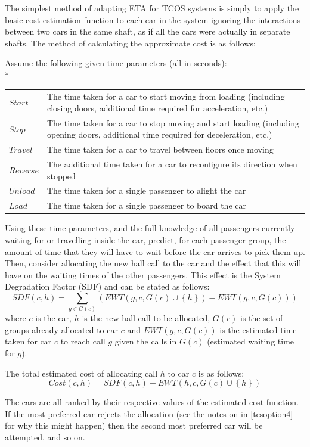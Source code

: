 \documentclass{UoYCSproject}
\begin{document}
The simplest method of adapting ETA for TCOS systems is simply to apply the basic cost estimation function to each car in the system ignoring the interactions between two cars in the same shaft, as if all the cars were actually in separate shafts.  The method of calculating the approximate cost is as follows:

Assume the following given time parameters (all in seconds):\\*
\begin{tabularx}{\linewidth}{l X}
	$Start$		& The time taken for a car to start moving from loading (including closing doors, additional time required for acceleration, etc.) \\
	$Stop$		& The time taken for a car to stop moving and start loading (including opening doors, additional time required for deceleration, etc.) \\
	$Travel$	& The time taken for a car to travel between floors once moving \\
	$Reverse$	& The additional time taken for a car to reconfigure its direction when stopped \\
	$Unload$	& The time taken for a single passenger to alight the car \\
	$Load$		& The time taken for a single passenger to board the car
\end{tabularx}

Using these time parameters, and the full knowledge of all passengers currently waiting for or travelling inside the car, predict, for each passenger group, the amount of time that they will have to wait before the car arrives to pick them up.  Then, consider allocating the new hall call to the car and the effect that this will have on the waiting times of the other passengers.  This effect is the System Degradation Factor (SDF) and can be stated as follows:
\[ SDF(c, h) = \sum\limits_{g \in G(c)} (EWT(g, c, G(c) \cup \left\{ h \right\}) - EWT(g, c, G(c)))\]
where $c$ is the car, $h$ is the new hall call to be allocated, $G(c)$ is the set of groups already allocated to car $c$ and $EWT(g,c,G(c))$ is the estimated time taken for car $c$ to reach call $g$ given the calls in $G(c)$ (estimated waiting time for $g$).

The total estimated cost of allocating call $h$ to car $c$ is as follows:
\[ Cost(c, h) = SDF(c, h) + EWT(h, c, G(c) \cup \left\{ h \right\}) \]

The cars are all ranked by their respective values of the estimated cost function.  If the most preferred car rejects the allocation (see the notes on in \autoref{tesoption4} for why this might happen) then the second most preferred car will be attempted, and so on.
\end{document}
